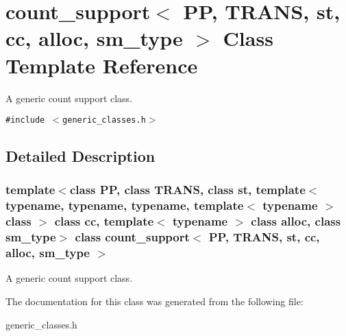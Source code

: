 \section{count\_\-support$<$ PP, TRANS, st, cc, alloc, sm\_\-type $>$ Class Template Reference}
\label{classcount__support}
A generic count support class.  


{\tt \#include $<$generic\_\-classes.h$>$}



\subsection{Detailed Description}
\subsubsection*{template$<$class PP, class TRANS, class st, template$<$ typename, typename, typename, template$<$ typename $>$ class $>$ class cc, template$<$ typename $>$ class alloc, class sm\_\-type$>$ class count\_\-support$<$ PP, TRANS, st, cc, alloc, sm\_\-type $>$}

A generic count support class. 



The documentation for this class was generated from the following file:\begin{CompactItemize}
\item 
generic\_\-classes.h\end{CompactItemize}
